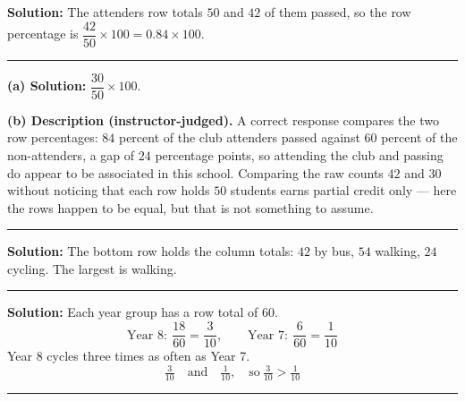 \documentclass[12pt]{article}
\begin{document}

\textbf{Solution:} \quad The attenders row totals $50$ and $42$ of them passed, so the row
percentage is $\dfrac{42}{50} \times 100 = 0.84 \times 100$. 

\vspace{0.2cm}

\noindent\rule{\linewidth}{0.2pt}


\textbf{(a) Solution:} \quad $\dfrac{30}{50} \times 100$. 

\textbf{(b) Description (instructor-judged).} A correct response compares the two row percentages:
$84$ percent of the club attenders passed against $60$ percent of the non-attenders, a gap of $24$
percentage points, so attending the club and passing do appear to be associated in this school.
Comparing the raw counts $42$ and $30$ without noticing that each row holds $50$ students earns
partial credit only --- here the rows happen to be equal, but that is not something to assume.

\vspace{0.2cm}

\noindent\rule{\linewidth}{0.2pt}


\textbf{Solution:} \quad The bottom row holds the column totals: $42$ by bus, $54$ walking, $24$
cycling. The largest is walking. 

\vspace{0.2cm}

\noindent\rule{\linewidth}{0.2pt}


\textbf{Solution:} \quad Each year group has a row total of $60$.
\[ \text{Year 8}: \ \frac{18}{60} = \frac{3}{10}, \qquad \text{Year 7}: \ \frac{6}{60} = \frac{1}{10} \]
Year 8 cycles three times as often as Year 7.
\[ \boxed{\tfrac{3}{10} \quad \text{and} \quad \tfrac{1}{10}, \quad \text{so} \ \tfrac{3}{10} > \tfrac{1}{10}} \]

\vspace{0.2cm}

\noindent\rule{\linewidth}{0.2pt}

\end{document}
